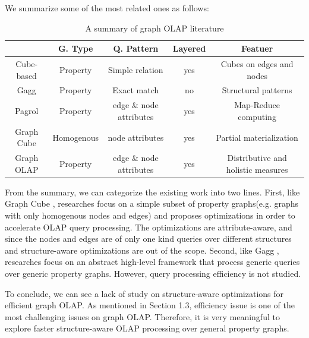 We summarize some of the most related ones as follows:
 \begin{table}
 	\footnotesize
 \begin{center}
 	\begin{tabular}{ | c | c | c | c | c |  }
 		\hline
 		 & G. Type & Q. Pattern & Layered & Featuer\\ \hline
 		 Cube-based \cite{DBLP:conf/sofsem/JakawatFL16} & Property & Simple relation & yes & Cubes on edges and nodes\\ \hline
 		 Gagg \cite{DBLP:conf/esws/MaaliCD15} & Property & Exact match & no & Structural patterns\\ \hline
 		 Pagrol \cite{DBLP:conf/icde/WangFWTAA14} & Property & edge \& node attributes & yes & Map-Reduce computing\\ \hline
 		 Graph Cube \cite{DBLP:conf/sigmod/ZhaoLXH11} & Homogenous  & node attributes & yes & Partial materialization\\ \hline
 		 Graph OLAP \cite{DBLP:conf/icdm/ChenYZHY08} & Property & edge \& node attributes & yes & Distributive and holistic measures\\ \hline
 		
 	\end{tabular}
 	\end {center}
 	\caption{A summary of graph OLAP literature}
\end{table}


From the summary, we can categorize the existing work into two lines. First, like Graph Cube \cite{DBLP:conf/sigmod/ZhaoLXH11}, researches focus on a simple subset of property graphs(e.g. graphs with only homogenous nodes and edges) and proposes optimizations in order to accelerate OLAP query processing. The optimizations are attribute-aware, and since the nodes and edges are of only one kind queries over different structures and structure-aware optimizations are out of the scope. Second, like Gagg \cite{DBLP:conf/esws/MaaliCD15}, researches focus on an abstract high-level framework that process generic queries over generic property graphs. However, query processing efficiency is not studied.

To conclude, we can see a lack of study on structure-aware optimizations for efficient graph OLAP. As mentioned in Section 1.3, efficiency issue is one of the most challenging issues on graph OLAP. Therefore, it is very meaningful to explore faster structure-aware OLAP processing over general property graphs.





